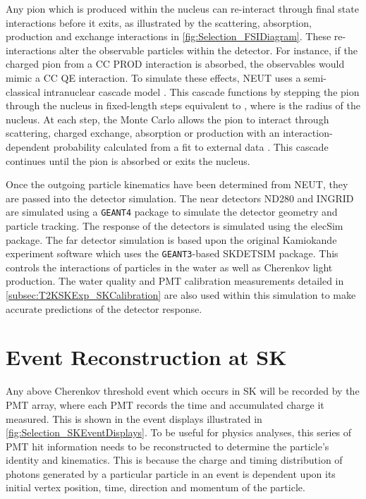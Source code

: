 Any pion which is produced within the nucleus can re-interact through final state interactions before it exits, as illustrated by the scattering, absorption, production and exchange interactions in \autoref{fig:Selection_FSIDiagram}. These re-interactions alter the observable particles within the detector. For instance, if the charged pion from a CC PROD interaction is absorbed, the observables would mimic a CC QE interaction. To simulate these effects, NEUT uses a semi-classical intranuclear cascade model \cite{Hayato2021}. This cascade functions by stepping the pion through the nucleus in fixed-length steps equivalent to , where  is the radius of the nucleus. At each step, the Monte Carlo allows the pion to interact through scattering, charged exchange, absorption or production with an interaction-dependent probability calculated from a fit to external data \cite{PhysRevD.99.052007}. This cascade continues until the pion is absorbed or exits the nucleus.

Once the outgoing particle kinematics have been determined from NEUT, they are passed into the detector simulation. The near detectors ND280 and INGRID are simulated using a \texttt{GEANT4} package \cite{t2k_det,geant4} to simulate the detector geometry and particle tracking. The response of the detectors is simulated using the elecSim package. The far detector simulation is based upon the original Kamiokande experiment software which uses the \texttt{GEANT3}-based SKDETSIM \cite{Brun:1987ma,t2k_det} package. This controls the interactions of particles in the water as well as Cherenkov light production. The water quality and PMT calibration measurements detailed in \autoref{subsec:T2KSKExp_SKCalibration} are also used within this simulation to make accurate predictions of the detector response.

\section{Event Reconstruction at SK}
\label{sec:Simulation_Reconstruction}

Any above Cherenkov threshold event which occurs in SK will be recorded by the PMT array, where each PMT records the time and accumulated charge it measured. This is shown in the event displays illustrated in \autoref{fig:Selection_SKEventDisplays}. To be useful for physics analyses, this series of PMT hit information needs to be reconstructed to determine the particle's identity and kinematics. This is because the charge and timing distribution of photons generated by a particular particle in an event is dependent upon its initial vertex position, time, direction and momentum of the particle. 


